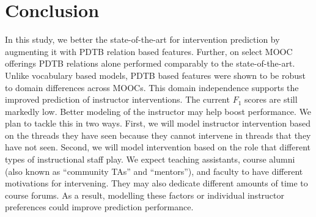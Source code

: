 \documentclass[letterpaper]{article}
\begin{document}

\section{Conclusion}
\label{sect:conclusion}
In this study, we better the state-of-the-art for intervention prediction 
by augmenting it with PDTB relation based features. Further, on select MOOC offerings PDTB relations alone performed comparably to the state-of-the-art.
Unlike vocabulary based models, PDTB based features were shown to be robust to 
domain differences across MOOCs. This domain independence supports the improved prediction of instructor interventions.
The current $F_1$ scores are still markedly low. Better modeling of the instructor may help boost performance. We plan to tackle this in two ways.  First, we will model instructor intervention based on the threads they have seen because they cannot intervene in threads that they have not seen. Second, we will model intervention based on the role that different types of instructional staff play. We expect teaching assistants, course alumni (also known as ``community TAs'' and ``mentors''), and faculty to have different motivations for intervening. They may also dedicate different amounts of time to course forums. As a result, modelling these factors or individual instructor preferences could improve prediction performance. 

\end{document}
